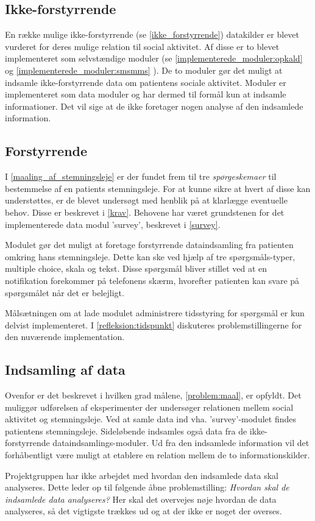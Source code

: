 \subsection{Ikke-forstyrrende}
En række mulige ikke-forstyrrende (se \cref{ikke_forstyrrende}) datakilder er blevet vurderet for deres mulige relation til social aktivitet.
Af disse er to blevet implementeret som selvstændige moduler (se \cref{implementerede_moduler:opkald}  og \cref{implementerede_moduler:smsmms} ).
De to moduler gør det muligt at indsamle ikke-forstyrrende data om patientens sociale aktivitet.
Moduler er implementeret som data moduler og har dermed til formål kun at indsamle informationer.
Det vil sige at de ikke foretager nogen analyse af den indsamlede information.

\subsection{Forstyrrende}
I \cref{maaling_af_stemningsleje} er der fundet frem til tre \textit{spørgeskemaer} til bestemmelse af en patients stemningsleje.
For at kunne sikre at hvert af disse kan understøttes, er de blevet undersøgt med henblik på at klarlægge eventuelle behov.
Disse er beskrevet i \cref{krav}.
Behovene har været grundstenen for det implementerede data modul 'survey', beskrevet i \cref{survey}.

Modulet gør det muligt at foretage forstyrrende dataindsamling fra patienten omkring hans stemningsleje.
Dette kan ske ved hjælp af tre spørgsmåls-typer, multiple choice, skala og tekst.
Disse spørgsmål bliver stillet ved at en notifikation forekommer på telefonens skærm, hvorefter patienten kan svare på spørgsmålet når det er belejligt.

Målsætningen om at lade modulet administrere tidsstyring for spørgsmål er kun delvist implementeret.
I \cref{refleksion:tidspunkt} diskuteres problemstillingerne for den nuværende implementation.
\subsection{Indsamling af data}
Ovenfor er det beskrevet i hvilken grad målene, \cref{problem:maal}, er opfyldt.
Det muliggør udførelsen af eksperimenter der undersøger relationen mellem social aktivitet og stemningsleje.
Ved at samle data ind vha. 'survey'-modulet findes patientens stemningsleje.
Sideløbende indsamles også data fra de ikke-forstyrrende dataindsamlings-moduler.
Ud fra den indsamlede information vil det forhåbentligt være muligt at etablere en relation mellem de to informationskilder.

Projektgruppen har ikke arbejdet med hvordan den indsamlede data skal analyseres.
Dette leder op til følgende åbne problemstilling: \textit{Hvordan skal de indsamlede data analyseres?}
Her skal det overvejes nøje hvordan de data analyseres, så det vigtigste trækkes ud og at der ikke er noget der overses.
